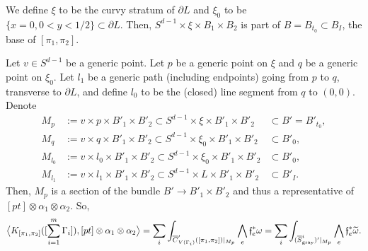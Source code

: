 \documentclass[11pt]{article}
\theoremstyle{definition}
\theoremstyle{remark}
\def\wt#1{\widetilde{#1}}
\def\ov#1{\overline{#1}}
\def\sgray{{\textnormal{gray}}}
\def\ff{\mathfrak{f}}
\begin{document}
We define $\xi$ to be the curvy stratum of $\partial L$ and $\xi_0$ to be $\{x=0,0<y<1/2\}\subset\partial L$. 
Then, $S^{d-1}\times\xi\times B_1\times B_2$ is part of $B=B_{t_0}\subset B_I$, the base of $[\pi_1,\pi_2]$. 

Let $v\in S^{d-1}$ be a generic point. 
Let $p$ be a generic point on $\xi$ and $q$ be a generic point on $\xi_0$. Let $l_1$ be a generic path (including endpoints) going from $p$ to $q$, transverse to $\partial L$, and define $l_0$ to be the (closed) line segment from $q$ to $(0,0)$. 
Denote 
\begin{align*}
M_{p}&:=v\times p\times B'_1\times B'_2\subset S^{d-1}\times \xi\times B'_1\times B'_2&\subset B'=B'_{t_0},\\
M_{q}&:=v\times q\times B'_1\times B'_2\subset S^{d-1}\times \xi_0\times B'_1\times B'_2&\subset B'_0,\\
M_{l_0}&:=v\times l_0\times B'_1\times B'_2\subset S^{d-1}\times \xi_0\times B'_1\times B'_2&\subset B'_0,\\
M_{l_1}&:=v\times l_1\times B'_1\times B'_2\subset S^{d-1}\times L\times B'_1\times B'_2&\subset B'_I. 
\end{align*}
Then, $M_p$ is a section of the bundle $B'\to B'_1\times B'_2$ and thus a representative of $[pt]\otimes\alpha_1\otimes\alpha_2$. 
So,  
\begin{equation}
\label{integral2_eqn}
\big\langle K_{[\pi_1,\pi_2]}([\sum_{i=1}^m\Gamma_i]), [pt]\otimes\alpha_1\otimes\alpha_2 \big\rangle=
\sum_{i}\int_{\ov{C}'_{V(\Gamma_i)}([\pi_1,\pi_2])|_{M_p}}\bigwedge_{e}\ff_e^*{\omega}=
\sum_{i}\int_{(\ov{S}_{\sgray}^i)'|_{M_p}}\bigwedge_{e}\ff_e^*\wt{\omega}.
\end{equation}
\end{document}
